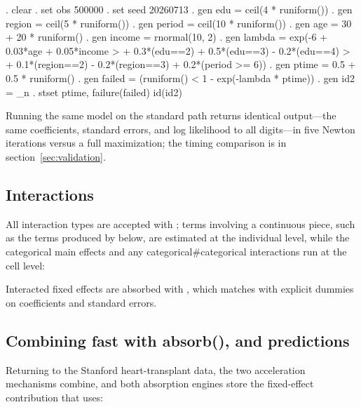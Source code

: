 \documentclass[12pt,a4paper]{article}
\begin{document}
\begin{stlog}
. clear
. set obs 500000
. set seed 20260713
. gen edu    = ceil(4 * runiform())
. gen region = ceil(5 * runiform())
. gen period = ceil(10 * runiform())
. gen age    = 30 + 20 * runiform()
. gen income = rnormal(10, 2)
. gen lambda = exp(-6 + 0.03*age + 0.05*income
>     + 0.3*(edu==2) + 0.5*(edu==3) - 0.2*(edu==4)
>     + 0.1*(region==2) - 0.2*(region==3) + 0.2*(period >= 6))
. gen ptime  = 0.5 + 0.5 * runiform()
. gen failed = (runiform() < 1 - exp(-lambda * ptime))
. gen id2    = _n
. stset ptime, failure(failed) id(id2)
{\smallskip}
\oom
\end{stlog}

\begin{stlog}
\nullskip
\end{stlog}

\noindent Running the same model on the standard path returns identical
output---the same coefficients, standard errors, and log likelihood to
all digits---in five Newton iterations versus a full 
maximization; the timing comparison is in
section~\ref{sec:validation}.

\subsection{Interactions}\label{interactions}

All interaction types are accepted with ; terms involving a
continuous piece, such as the  terms produced by
 below, are estimated at the individual level,
while the categorical main effects and any categorical\#categorical
interactions run at the cell level:

\begin{stlog}
\nullskip
\end{stlog}

\noindent Interacted fixed effects are absorbed with
, which matches  with explicit
 dummies on coefficients and standard errors.

\subsection{Combining fast with absorb(), and
predictions}\label{combining-fast-with-absorb-and-predictions}

Returning to the Stanford heart-transplant data, the two acceleration
mechanisms combine, and both absorption engines store the fixed-effect
contribution that  uses:
\end{document}
